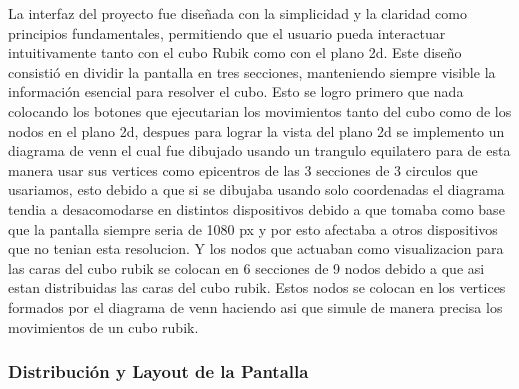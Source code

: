                                                                                                                                                                                                                                                                                                                                                                                                                                                                                                                                                                                                                                                                                                                                                                                                                                                                                                                                                                                                                                                                                                                                                                                                                                                                                                                                                                                                                                                                                                                                                                                                                                                                                                                                                                                                                                                                                                                                                                                                                                                                                                                                                                                                                                                                                                                                                                                                                                                                                                                                                                                                                                                                                                                                                                                                                                                                                                                                                                                                                                                                                                                                                                                                                                                                                                                                                                                                                                                                                                                                                                                                                                                                                                                                                                                                                                                                                                                                                                                                                                                                                                                                                                                                                                                                                                                                                                                                                                                                                                                                                                                                                                                                                                                                                                                                                                                                                                                                                                                                                                                                                                                                                                                                                                                                                                                                                                                                                                                                                                                                                                                                                                                                                                                                                                                                                                                                                                                                                                                                                                                                                                                                                                                                                                                                                                                                                                                                                                                                                                                                                                                                                                                                                                                                                                                                                                                                                                                                                                                                                                                                                                                                                                                                                                                                                                                                                                                                                                                                                                                                                                                                                                                                                                                                                                                                                                                                                                                                                                                                                                                                                                                                                                                                                                                                                                                                                                                                                                                                                                                                                                                                                                                                                                                                                                                                                                                                                                                                                                                                                                                                                                                                                                                                                                                                                                                                                                                                                                                                                                                                                                                                                                                                                                                                                                                                                                                                                                                                                                                                                                                                                                                                                                                                                                                                                                                                                                                                                                                                                                                                                                                                                                                                                                                                                                                                                                                                                                                                                                                                                                                                                                                                                                                                                                                                                                                                                                                                                                                                                                                                                                                                                                                                                                                                                                                                                                                                                                                                                                                                                                                                                                                                                                                                                                                                                                                                                                                                                                                                                                                                                                                                                                                                                                                                                                                                                                                                                                                                                                                                                                                                                                                                                                                                                                                                                                                                                                                                                                                                                                                                                                                                                                                                                                                                                                                                                                                                                                                                                                                                                                                                                                                                                                                                                                                                                                                                                                                                                                                                                                                                                                                                                                                                                                                                                                                                                                                                                                                                                                                                                                                                                                                                                                                                                                                                                                                                                                                                                                                                                                                                                                                                                                                                                                                                                                                                                                                                                                                                                                                                                                                                                                                                                                                                                                                                                                                                                                                                                                                                                                                                                                                                                                                                                                                                                                                                                                                                                                                                                                                                                                                                                                                                                                                                                                                                                                                                                                                                                                                                                                                                                                                                                                                                                                                                                                                                                                                                                                                                                                                                                                                                                                                                                                                                                                                                                                                                                                                                                                                                                                                                                                                                                                                                                                                                                                                                                                                                                                                                                                                                                                                                                                                                                                                                                                                                                                                                                                                                                                                                                                                                                                                                                                                                                                                                                                                                                                                                                                                                                                                                                                                                                                                                                                                                                                                                                                                                                                                                                                                                                                                                                                                                                                                                                                                                                                                                                                                                                                                                                                                                                                                                                                                                                                                                                                                                                                                                                                                                                                                                                                                                                                                                                                                                                                                                                                                                                                                                                                                                                                                                                                                                                                                                                                                                                                                                                                                                                                                                                                                                                                                                                                                                                                                                                                                                                                                                                                                                                                                                                                                                                                                                                                                                                                                                                                                                                                                                                                                                                                                                                                                                                                                                                                                                                                                                                                                                                                                                                                                                                                                                                                                                                                                                                                                                                                                                                                                                                                                                                                                                                                                                                                                                                                                                                                                                                                                                                                                                                                                                                                                                                                                                                                                                                                                                                                                                                                                                                                                                                                                                                                                                                                                                                                                                                                                                                                                                                                                                                                                                                                                                                                                                                                                                                                                                                                                                                                                                                                                                                                                                                                                                                                                                                                                                                                                                                                                                                                                                                                                                                                                                                                                                                                                                                                                                                                                                                                                                                                                                                                                                                                                                                                                                                                                                                                                                                                                                                                                                                                                                                                                                                                                                                                                                                                                                                                                                                                                                                                                                                                                                                                                                                                                                                                                                                                                                                                                                                                                                                                                                                                                                                                                                                                                                                                                                                                                                                                                                                                                                                                                                                                                                                                                                                                                                                                                                                                                                                                                                                                                                                                                                                                                                                                                                                                                                                                                                                                                                                                                                                                                                                                                                                                                                                                                                                                                                                                                                                                                                                                                                                                                                                                                                                                                                                                                                                                                                                                                                                                                                                                                                                                                                                                                                                                                                                                                                                                                                                                                                                                                                                                                                                                                                                                                                                                                                                                                                                                                                                                                                                                                                                                                                                                                                                                                                                                                                                                                                                                                                                                                                                                                                                                                                                                                                                                                                                                                                                                                                                                                                                                                                                                                                                                                                                                                                                                                                                                                                                                                                                                                                                                                                                                                                                                                                                                                                                                                                                                                                                                                                                                                                                                                                                                                                                                                                                                                                                                                                                                                                                                                                                                                                                                                                                                                                                                                                                                                                                                                                                                                                                                                                                                                                                                                                                                                                                                                                                                                                                                                                                                                                                                                                                                                                                                                                                                                                                                                                                                                                                                                                                                                                                                                                                                                                                                                                                                                                                                                                                                                                                                                                                                                                                                                                                                                                                                                                                                                                                                                                                                                                                                                                                                                                                                                                                                                                                                                                                                                                                                                                                                                                                                                                                                                                                                                                                                                                                                                                                                                                                                                                                                                                                                                                                                                                                                                                                                                                                                                                                                                                                                                                                                                                                                                                                                                                                                                                                                                                                                                                                                                                                                                                                                                                                                                                                                                                                                                                                                                                                                                                                                                                                                                                                                                                                                                                                                                                                                                                                                                                                                                                                                                                                                                                                                                                                                                                                                                                                                                                                                                                                                                                                                                                                                                                                                                                                                                                                                                                                                                                                                                                                                                                                                                                                                                                                                                                                                                                                                                                                                                                                                                                                                                                                                                                                                                                                                                                                                                                                                                                                                                                                                                                                                                                                                                                                                                                                                                                                                                                                                                                                                                                                                                                                                                                                                                                                                                                                                                                                                                                                                                                                                                                                                                                                                                                                                                                                                                                                                                                                                                                                                                                                                                                                                                                                                                                                                                                                                                                                                                                                                                                                                                                                                                                                                                                                                                                                                                                                                                                                                                                                                                                                                                                                                                                                                                                                                                                                                                                                                                                                                                                                                                                                                                                                                                                                                                                                                                                                                                                                                                                                                                                                                                                                                                                                                                                                                                                                                                                                                                                                                                                                                                                                                                                                                                                                                                                                                                                                                                                                                                                                                                                                                                \documentclass[conference]{IEEEtran}
\begin{document}
La interfaz del proyecto fue diseñada con la simplicidad y la claridad como principios fundamentales, permitiendo que el usuario pueda interactuar intuitivamente tanto con el cubo Rubik como con el plano 2d. Este diseño consistió en dividir la pantalla en tres secciones, manteniendo siempre visible la información esencial para resolver el cubo.\newline
Esto se logro primero que nada colocando los botones que ejecutarian los movimientos tanto del cubo como de los nodos en el plano 2d, despues para lograr la vista del plano 2d se implemento un diagrama de venn el cual fue dibujado usando un trangulo equilatero para de esta manera usar sus vertices como epicentros de las 3 secciones de 3 circulos que usariamos, esto debido a que si se dibujaba usando solo coordenadas el diagrama tendia a desacomodarse en distintos dispositivos debido a que tomaba como base que la pantalla siempre seria de 1080 px y por esto afectaba a otros dispositivos que no tenian esta resolucion. Y los nodos que actuaban como visualizacion para las caras del cubo rubik se colocan en 6 secciones de 9 nodos debido a que asi estan distribuidas las caras del cubo rubik. Estos nodos se colocan en los vertices formados por el diagrama de venn haciendo asi que simule de manera precisa los movimientos de un cubo rubik.

\subsubsection{Distribución y Layout de la Pantalla} 
\end{document}

